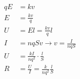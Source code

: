 \[
		\begin{aligned}
			qE&= kv\\
			E&= \frac{kv}{q}\\
			U&= El = \frac{kv}{q}l\\
			I&= nqSv\rightarrow v = \frac{I}{nqS}\\
			U&= \frac{kI}{nq^2}\cdot\frac{l}{S}\\
			R&= \frac{U}{I} =\frac{k}{nq^2}\frac{l}{S}\\
		\end{aligned}
	\]